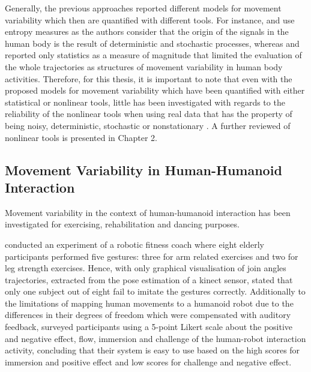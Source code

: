 Generally, the previous approaches reported different models 
for movement variability which then are quantified with different tools.
For instance, \cite{hatze1986} and \cite{preatoni2010, preatoni2013} 
use entropy measures as the authors consider that the origin of the 
signals in the human body is the result of deterministic and 
stochastic processes, whereas 
\cite{muller2004} and \cite{seifert2011} reported only
statistics as a measure of magnitude that limited the evaluation of the 
whole trajectories as structures of movement variability in 
human body activities.
Therefore, for this thesis, it is important to note that
even with the proposed models for movement variability 
\citep{hatze1986, preatoni2010, preatoni2013, muller2004, seifert2011} 
which have been quantified with either statistical or nonlinear tools,
little has been investigated with regards to the reliability of the nonlinear 
tools when using real data that has the property of being noisy, deterministic,
stochastic or nonstationary \citep{newell1998}.
A further reviewed of nonlinear tools is presented in Chapter 2.





\subsection{Movement Variability in Human-Humanoid Interaction}
Movement variability in the context of human-humanoid interaction has been 
investigated for exercising, rehabilitation and dancing purposes. 

\cite{gorer2013} conducted an experiment of a robotic fitness coach 
where eight elderly participants performed five gestures: 
three for arm related exercises and two for leg strength exercises. 
Hence, \cite{gorer2013} with only graphical 
visualisation of join angles trajectories, extracted from the pose estimation
of a kinect sensor, 
stated that only one subject out of eight fail to imitate the gestures 
correctly.
Additionally to the limitations of mapping human movements to a humanoid robot
due to the differences in their degrees of freedom which were compensated 
with auditory feedback, \cite{gorer2013} surveyed 
participants using a 5-point Likert scale about the positive and 
negative effect, flow, immersion and challenge of the human-robot 
interaction activity, concluding that their system is easy to use 
based on the high scores for immersion and 
positive effect and low scores for challenge and negative effect.

